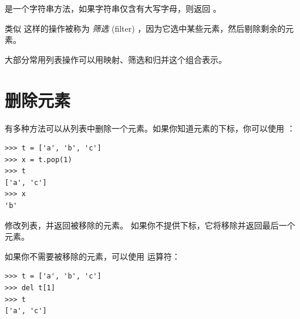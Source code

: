 %

 是一个字符串方法，如果字符串仅含有大写字母，则返回 。


类似  这样的操作被称为 {\em 筛选} (filter) ，因为它选中某些元素，然后剔除剩余的元素。


大部分常用列表操作可以用映射、筛选和归并这个组合表示。


\section{删除元素}
  


有多种方法可以从列表中删除一个元素。如果你知道元素的下标，你可以使用  ：

  

\begin{lstlisting}
>>> t = ['a', 'b', 'c']
>>> x = t.pop(1)
>>> t
['a', 'c']
>>> x
'b'
\end{lstlisting}

%

 修改列表，并返回被移除的元素。 如果你不提供下标，它将移除并返回最后一个元素。


如果你不需要被移除的元素，可以使用  运算符：

  

\begin{lstlisting}
>>> t = ['a', 'b', 'c']
>>> del t[1]
>>> t
['a', 'c']
\end{lstlisting}

